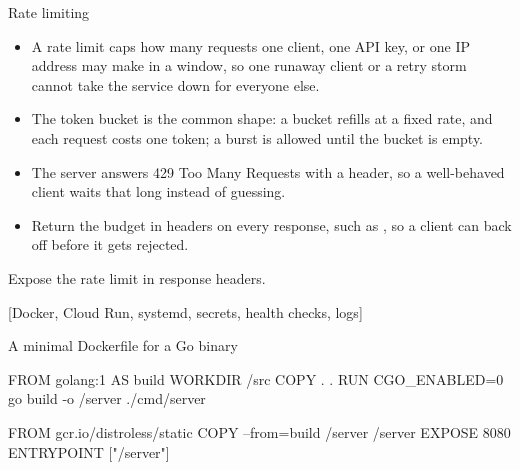 \documentclass[10pt,aspectratio=169,t]{beamer}
\begin{document}
\begin{frame}[eyebrow=API design]{Rate limiting}
  \vskip 1mm
  \begin{itemize}
    \item A rate limit caps how many requests one client, one API key, or one IP address may make in a window, so one runaway client or a retry storm cannot take the service down for everyone else.
    \item The token bucket is the common shape: a bucket refills at a fixed rate, and each request costs one token; a burst is allowed until the bucket is empty.
    \item The server answers 429 Too Many Requests with a  header, so a well-behaved client waits that long instead of guessing.
    \item Return the budget in headers on every response, such as , so a client can back off before it gets rejected.
  \end{itemize}
  \begin{takeaway}{Expose the rate limit in response headers.}
  \end{takeaway}
\end{frame}

[Docker, Cloud Run, systemd, secrets, health checks, logs]

\begin{frame}[fragile,eyebrow=Deploying]{A minimal Dockerfile for a Go binary}
\begin{codeblock}
FROM golang:1 AS build
WORKDIR /src
COPY . .
RUN CGO_ENABLED=0 go build -o /server ./cmd/server

FROM gcr.io/distroless/static
COPY --from=build /server /server
EXPOSE 8080
ENTRYPOINT ["/server"]
\end{codeblock}
  \vskip 2mm
\end{frame}
\end{document}
